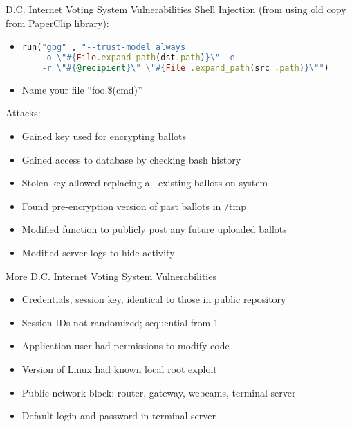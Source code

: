 \documentclass{beamer}
\begin{document}
\begin{frame}[fragile]{D.C. Internet Voting System Vulnerabilities}
Shell Injection (from using old copy from PaperClip library):
\begin{itemize}
\item[]
\begin{lstlisting}[language=Ruby]
run("gpg" , "--trust-model always
    -o \"#{File.expand_path(dst.path)}\" -e
    -r \"#{@recipient}\" \"#{File .expand_path(src .path)}\"")
\end{lstlisting}
\pause
\item[] Name your file ``foo.\$(cmd)''
\end{itemize}
\pause
Attacks:
\begin{itemize}
\item Gained key used for encrypting ballots
\item Gained access to database by checking bash history
\item Stolen key allowed replacing all existing ballots on system
\item Found pre-encryption version of past ballots in /tmp
\item Modified function to publicly post any future uploaded ballots
\item Modified server logs to hide activity
\end{itemize}
\end{frame}

\begin{frame}{More D.C. Internet Voting System Vulnerabilities}
\begin{itemize}
\item Credentials, session key, identical to those in public repository
\item Session IDs not randomized; sequential from 1
\item Application user had permissions to modify code
\item Version of Linux had known local root exploit
\item Public network block: router, gateway, webcams, terminal server
\item Default login and password in terminal server
\end{itemize}
\end{frame}
\end{document}
